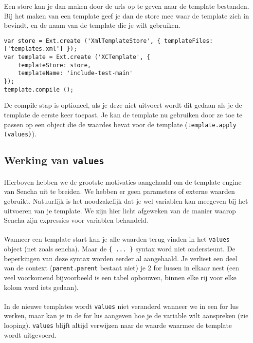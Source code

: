 Een store kan je dan maken door de urls op te geven naar de template bestanden. Bij het
maken van een template geef je dan de store mee waar de template zich in bevindt, en de
naam van de template die je wilt gebruiken.

\begin{lstlisting}[language=ownjavascript]
var store = Ext.create ('XmlTemplateStore', { templateFiles: ['templates.xml'] });
var template = Ext.create ('XCTemplate', {
	templateStore: store,
	templateName: 'include-test-main'
});
template.compile ();
\end{lstlisting}

De compile stap is optioneel, als je deze niet uitvoert wordt dit gedaan als je de
template de eerste keer toepast. Je kan de template nu gebruiken door ze toe te passen op
een object die de waardes bevat voor de template (\lstinline{template.apply (values)}).


\subsection {Werking van \lstinline {values}}

\paragraph {} Hierboven hebben we de grootste motivaties aangehaald om de template engine
van Sencha uit te breiden. We hebben er geen parameters of externe waarden gebruikt.
Natuurlijk is het noodzakelijk dat je wel variablen kan meegeven bij het uitvoeren van je
template. We zijn hier licht afgeweken van de manier waarop Sencha zijn expressies voor
variablen behandeld.

\paragraph {} Wanneer een template start kan je alle waarden terug vinden in het
\lstinline{values} object (net zoals sencha). Maar de \lstinline|{ ... }| syntax word niet
ondersteunt. De beperkingen van deze syntax worden eerder al aangehaald. Je verliest een
deel van de context (\lstinline{parent.parent} bestaat niet) je 2 for lussen in elkaar
nest (een veel voorkomend bijvoorbeeld is een tabel opbouwen, binnen elke rij voor elke
kolom word iets gedaan).

\paragraph {} In de nieuwe templates wordt \lstinline{values} niet veranderd wanneer we
in een for lus werken, maar kan je in de for lus aangeven hoe je de variable wilt
aanspreken (zie looping). \lstinline{values} blijft altijd verwijzen naar de waarde
waarmee de template wordt uitgevoerd.

